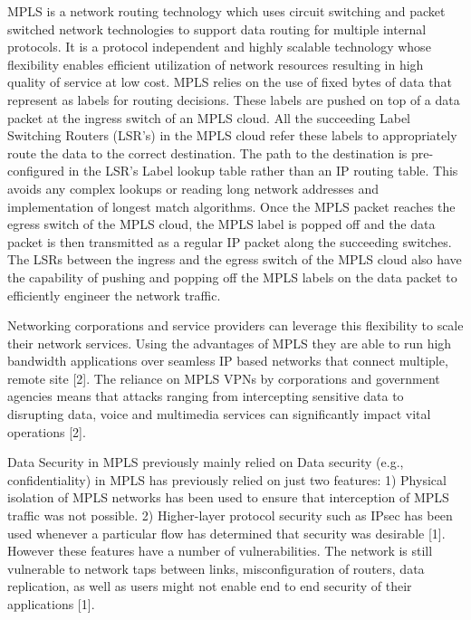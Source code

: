 \documentclass[a4paper, 12pt, oneside]{report}         %
\begin{document}
\begin{thesissummary}                           %

MPLS is a network routing technology which uses circuit switching and packet switched network technologies to support data routing for multiple internal protocols. It is a protocol independent and highly scalable technology whose flexibility enables efficient utilization of network resources resulting in high quality of service at low cost. MPLS relies on the use of fixed bytes of data that represent as labels for routing decisions. These labels are pushed on top of a data packet at the ingress switch of an MPLS cloud. All the succeeding Label Switching Routers (LSR's) in the MPLS cloud refer these labels to appropriately route the data to the correct destination. The path to the destination is pre-configured in the LSR's Label lookup table rather than an IP routing table. This avoids any complex lookups or reading long network addresses and implementation of longest match algorithms. Once the MPLS packet reaches the egress switch of the MPLS cloud, the MPLS label is popped off and the data packet is then transmitted as a regular IP packet along the succeeding switches. The LSRs between the ingress and the egress switch of the MPLS cloud also have the capability of pushing and popping off the MPLS labels on the data packet to efficiently engineer the network traffic.

	Networking corporations and service providers can leverage this flexibility to scale their network services. Using the advantages of MPLS they are able to run high bandwidth applications over seamless IP based networks that connect multiple, remote site [2]. The reliance on MPLS VPNs by corporations and government agencies means that attacks ranging from intercepting sensitive data to disrupting data, voice and multimedia services can significantly impact vital operations [2].

	Data Security in MPLS previously mainly relied on  Data security (e.g., confidentiality) in MPLS has previously relied on just two features: 1) Physical isolation of MPLS networks has been used to ensure that interception of MPLS traffic was not possible. 2) Higher-layer protocol security such as IPsec has been used whenever a particular flow has determined that security was desirable [1]. However these features have a number of vulnerabilities. The network is still vulnerable to network taps between links, misconfiguration of routers, data replication, as well as users might not enable end to end security of their applications [1].
    

\end{thesissummary}
\end{document}
